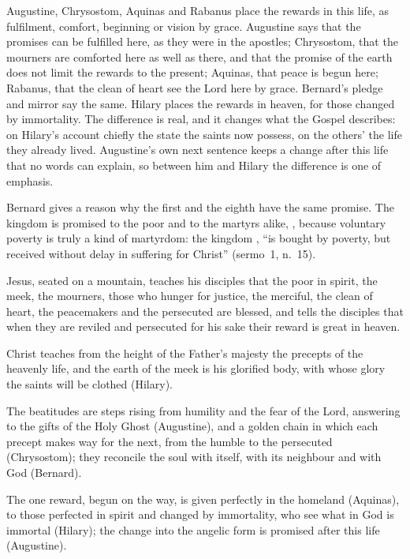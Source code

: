 Augustine, Chrysostom, Aquinas and Rabanus place the rewards in this life,
as fulfilment, comfort, beginning or vision by grace. Augustine says that the
promises can be fulfilled here, as they were in the apostles; Chrysostom, that
the mourners are comforted here as well as there, and that the promise of the
earth does not limit the rewards to the present; Aquinas, that peace is begun
here; Rabanus, that the clean of heart see the Lord here by grace. Bernard's
pledge and mirror say the same. Hilary places the rewards in heaven, for those
changed by immortality. The difference is real, and it changes what the Gospel
describes: on Hilary's account chiefly the state the saints now possess, on the
others' the life they already lived. Augustine's own next sentence keeps a
change after this life that no words can explain, so between him and Hilary the
difference is one of emphasis.

Bernard gives a reason why the first and the eighth have the same promise. The
kingdom is promised to the poor and to the martyrs alike, , because voluntary poverty is truly a
kind of martyrdom: the kingdom , ``is bought by poverty,
but received without delay in suffering for Christ'' (sermo~1, n.~15).

\begin{fourSenses}
\item[Literal.] Jesus, seated on a mountain, teaches his disciples that the
poor in spirit, the meek, the mourners, those who hunger for justice, the
merciful, the clean of heart, the peacemakers and the persecuted are blessed,
and tells the disciples that when they are reviled and persecuted for his sake
their reward is great in heaven.
\item[Allegorical.] Christ teaches from the height of the Father's majesty the
precepts of the heavenly life, and the earth of the meek is his glorified
body, with whose glory the saints will be clothed (Hilary).
\item[Moral.] The beatitudes are steps rising from humility and the fear of
the Lord, answering to the gifts of the Holy Ghost (Augustine), and a golden
chain in which each precept makes way for the next, from the humble to the
persecuted (Chrysostom); they reconcile the soul with itself, with its
neighbour and with God (Bernard).
\item[Anagogical.] The one reward, begun on the way, is given perfectly in the
homeland (Aquinas), to those perfected in spirit and changed by immortality,
who see what in God is immortal (Hilary); the change into the angelic form is
promised after this life (Augustine).
\end{fourSenses}
